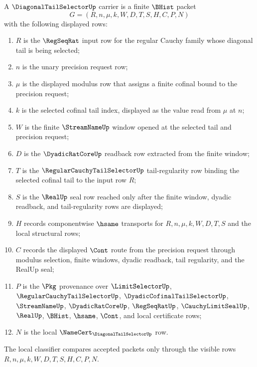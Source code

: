 \begin{definition}
\label{def:diagonal-tail-selector-carrier}
A $\DiagonalTailSelectorUp$ carrier is a finite $\BHist$ packet
$$
G=(R,n,\mu,k,W,D,T,S,H,C,P,N)
$$
with the following displayed rows:
\begin{enumerate}
\item $R$ is the $\RegSeqRat$ input row for the regular Cauchy family whose diagonal tail is being selected;
\item $n$ is the unary precision request row;
\item $\mu$ is the displayed modulus row that assigns a finite cofinal bound to the precision request;
\item $k$ is the selected cofinal tail index, displayed as the value read from $\mu$ at $n$;
\item $W$ is the finite $\StreamNameUp$ window opened at the selected tail and precision request;
\item $D$ is the $\DyadicRatCoreUp$ readback row extracted from the finite window;
\item $T$ is the $\RegularCauchyTailSelectorUp$ tail-regularity row binding the selected cofinal tail to the input row $R$;
\item $S$ is the $\RealUp$ seal row reached only after the finite window, dyadic readback, and tail-regularity rows are displayed;
\item $H$ records componentwise $\hsame$ transports for $R,n,\mu,k,W,D,T,S$ and the local structural rows;
\item $C$ records the displayed $\Cont$ route from the precision request through modulus selection, finite windows, dyadic readback, tail regularity, and the RealUp seal;
\item $P$ is the $\Pkg$ provenance over $\LimitSelectorUp$, $\RegularCauchyTailSelectorUp$, $\DyadicCofinalTailSelectorUp$, $\StreamNameUp$, $\DyadicRatCoreUp$, $\RegSeqRatUp$, $\CauchyLimitSealUp$, $\RealUp$, $\BHist$, $\hsame$, $\Cont$, and local certificate rows;
\item $N$ is the local $\NameCert_{\DiagonalTailSelectorUp}$ row.
\end{enumerate}
The local classifier compares accepted packets only through the visible rows $R,n,\mu,k,W,D,T,S,H,C,P,N$.
\end{definition}

